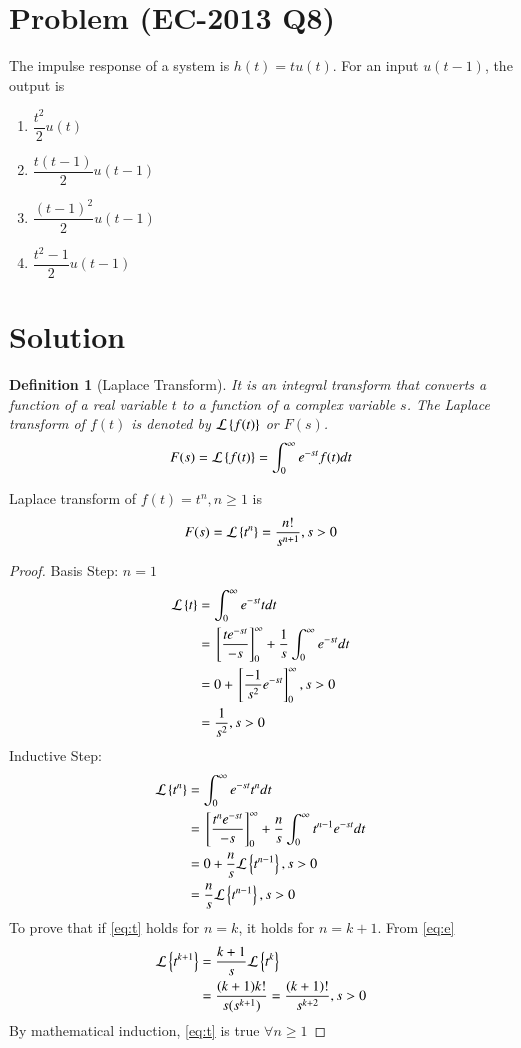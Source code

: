 \documentclass[journal,12pt,twocolumn]{IEEEtran}
\newtheorem{definition}{Definition}[section]
\begin{document}
\section{Problem (EC-2013 Q8)}
The impulse response of a system is $h(t)=tu(t)$. For an input $u(t-1)$, the output is 
\begin{enumerate}
    \item $\dfrac{t^{2}}{2}u(t)$
    \item $\dfrac{t(t-1)}{2}u(t-1)$
    \item $\dfrac{(t-1)^{2}}{2}u(t-1)$
    \item $\dfrac{t^{2}-1}{2}u(t-1)$
\end{enumerate}
\section{Solution}
\begin{definition}[Laplace Transform]
It is an integral transform that converts a function of a real variable $t$ to a function of a complex variable $s$. The Laplace transform of $f(t)$ is denoted by $\mathcal{L}\left\{f(t)\right\}$ or $F(s)$.
\begin{align}
    F(s)=\mathcal{L}\left\{f(t)\right\}=\int_{0}^{\infty}e^{-st}f(t)dt
\end{align}
\end{definition}
\begin{remark}
Laplace transform of $f(t)=t^n,n\geq1$ is
\begin{align}
    F(s)=\mathcal{L}\left\{t^n\right\}=\dfrac{n!}{s^{n+1}},s>0
    \label{eq:t}
\end{align}
\end{remark}
\begin{proof}
Basis Step: $n=1$
\begin{align}
    \mathcal{L}\left\{t\right\}&=\int_{0}^{\infty}e^{-st}tdt\\
    &={}\left[\dfrac{te^{-st}}{-s}\right]_{0}^{\infty}+\dfrac{1}{s}\int_{0}^{\infty}e^{-st}dt\\
    &=0+{}\left[\dfrac{-1}{s^2}e^{-st}\right]_{0}^{\infty},s>0\\
    &=\dfrac{1}{s^2},s>0
\end{align}
Inductive Step:
\begin{align}
    \mathcal{L}\left\{t^n\right\}&=\int_{0}^{\infty}e^{-st}t^ndt\\
    &={}\left[\dfrac{t^{n}e^{-st}}{-s}\right]_{0}^{\infty}+\dfrac{n}{s}\int_{0}^{\infty}t^{n-1}e^{-st}dt\\
    &=0+\dfrac{n}{s}\mathcal{L}\left\{t^{n-1}\right\},s>0\\
    &=\dfrac{n}{s}\mathcal{L}\left\{t^{n-1}\right\},s>0\label{eq:e}
\end{align}
To prove that if \eqref{eq:t} holds for $n=k$, it holds for $n=k+1$. From \eqref{eq:e}
\begin{align}
    \mathcal{L}\left\{t^{k+1}\right\}&=\dfrac{k+1}{s}\mathcal{L}\left\{t^{k}\right\}\\
    &=\dfrac{(k+1)k!}{s(s^{k+1})}=\dfrac{(k+1)!}{s^{k+2}},s>0
\end{align}
By mathematical induction, \eqref{eq:t} is true $\forall n\geq 1$
\end{proof}
\end{document}
